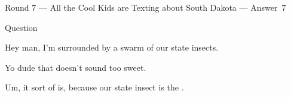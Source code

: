\documentclass[11pt]{beamer}
\begin{document}
\begin{frame}[t]{Round 7 --- All the Cool Kids are Texting about South Dakota --- \mbox{Answer 7}}
\begin{block}{Question}

\begin{minipage}{0.9\textwidth}
\begin{mdframed}[
    roundcorner=7pt,
    backgroundcolor=black!5,
    linecolor=black!5,
    fontcolor=black,
    ignorelastdescenders]
\begin{flushleft}
{\small{}\selectfont{}
Hey man, I'm surrounded by a swarm of our state insects.
}
\end{flushleft}
\end{mdframed}
\end{minipage}

\hfill{}\begin{minipage}{0.9\textwidth}
\begin{mdframed}[
    roundcorner=7pt,
    backgroundcolor=blue!80!white,
    linecolor=blue!80!white,
    fontcolor=white,
    ignorelastdescenders]
\begin{flushleft}
{\small{}\selectfont{}
Yo dude that doesn't sound too sweet.
}
\end{flushleft}
\end{mdframed}
\end{minipage}

\begin{minipage}{0.9\textwidth}
\begin{mdframed}[
    roundcorner=7pt,
    backgroundcolor=black!5,
    linecolor=black!5,
    fontcolor=black,
    ignorelastdescenders]
\begin{flushleft}
{\small{}\selectfont{}
Um, it sort of is, because our state insect is the \textunderscore{}\textunderscore{}\textunderscore{}\textunderscore{}\textunderscore{}\textunderscore{} \textunderscore{}\textunderscore{}\textunderscore{}\textunderscore{}\textunderscore{}\textunderscore{}.
}
\end{flushleft}
\end{mdframed}
\end{minipage}
\end{block}
\end{frame}
\end{document}
